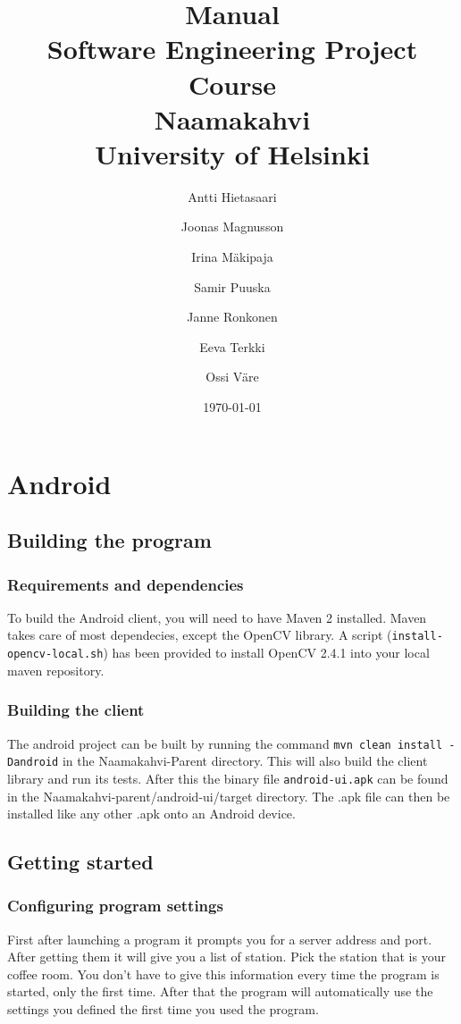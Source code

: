 \documentclass[11pt]{article}
\title{Manual\\
  Software Engineering Project Course\\
  Naamakahvi\\
  University of Helsinki}
\author{Antti Hietasaari
  \and Joonas Magnusson
  \and Irina Mäkipaja
  \and Samir Puuska
  \and Janne Ronkonen
  \and Eeva Terkki
  \and Ossi Väre}
\date{\today}
\begin{document}
\maketitle

\setcounter{tocdepth}{2}
\tableofcontents



\section{Android}
\subsection{Building the program}
\subsubsection*{Requirements and dependencies}
To build the Android client, you will need to have Maven 2 installed. Maven takes care of most dependecies, except the OpenCV library. A script (\texttt{install-opencv-local.sh}) has been provided to install OpenCV 2.4.1 into your local maven repository.
\subsubsection*{Building the client}
The android project can be built by running the command \texttt{mvn clean install -Dandroid} in the Naamakahvi-Parent directory. This will also build the client library and run its tests. After this the binary file \texttt{android-ui.apk} can be found in the Naamakahvi-parent/android-ui/target directory. The .apk file can then be installed like any other .apk onto an Android device.
\subsection{Getting started}
\subsubsection*{Configuring program settings}
First after launching a program it prompts you for a server address and port. After getting them it will give you a list of station. Pick the station that is your coffee room. You don’t have to give this information every time the program is started, only the first time. After that the program will automatically use the settings you defined the first time you used the program.
\end{document}
